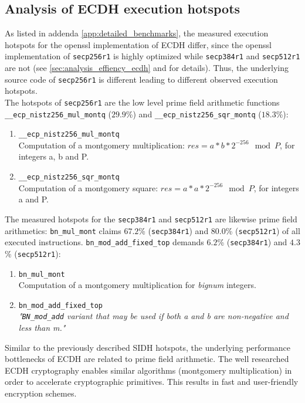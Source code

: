 \subsection{Analysis of \gls{ECDH} execution hotspots}
\label{sec:analysis_ecdh_hotspots}

As listed in addenda \ref{app:detailed_benchmarks}, the measured execution hotspots for the \gls{openssl} implementation of \gls{ECDH} differ, since the \gls{openssl} implementation of \texttt{secp256r1} is highly optimized while \texttt{secp384r1} and \texttt{secp512r1} are not (see \autoref{sec:analysis_effiency_ecdh} and \parencite{adalier2015efficient} for details). Thus, the underlying source code of \texttt{secp256r1} is different leading to different observed execution hotspots.\\
The hotspots of \texttt{secp256r1} are the low level prime field arithmetic functions\\\texttt{\_\_ecp\_nistz256\_mul\_montq} ($29.9$\%) and \texttt{\_\_ecp\_nistz256\_sqr\_montq} ($18.3$\%):
\begin{enumerate}
\item \texttt{\_\_ecp\_nistz256\_mul\_montq}\\Computation of a montgomery multiplication: $res = a*b*2^{-256}\mod P$, for integers a, b and P.
\item \texttt{\_\_ecp\_nistz256\_sqr\_montq} \\Computation of a montgomery square: $res = a*a*2^{-256}\mod P$, for integers a and P.
\end{enumerate}
The measured hotspots for the \texttt{secp384r1} and \texttt{secp512r1} are likewise prime field arithmetics: \texttt{bn\_mul\_mont} claims $67.2$\% (\texttt{secp384r1}) and $80.0$\% (\texttt{secp512r1}) of all executed instructions. \texttt{bn\_mod\_add\_fixed\_top} demands $6.2$\% (\texttt{secp384r1}) and $4.3$\% (\texttt{secp512r1}):
\begin{enumerate}
\item \texttt{bn\_mul\_mont}\\Computation of a montgomery multiplication for \textit{bignum} integers.
\item \texttt{bn\_mod\_add\_fixed\_top}\\\textit{"\texttt{BN\_mod\_add} variant that may be used if both a and b are non-negative and less than m."}
\end{enumerate}
Similar to the previously described \gls{SIDH} hotspots, the underlying performance bottlenecks of \gls{ECDH} are related to prime field arithmetic. The well researched \gls{ECDH} cryptography enables similar  algorithms (montgomery multiplication) in order to accelerate cryptographic primitives. This results in fast and user-friendly encryption schemes.

